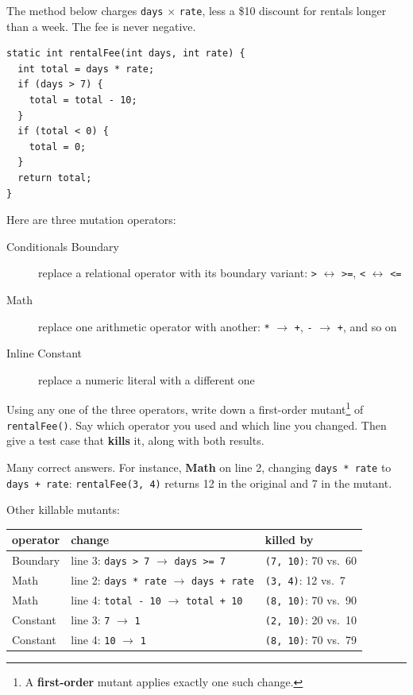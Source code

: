 \documentclass[addpoints]{exam}
\begin{document}
\begin{questions}

\question The method below charges \texttt{days} $\times$
  \texttt{rate}, less a \$10 discount for rentals longer than a week.
  The fee is never negative.

\begin{verbatim}
static int rentalFee(int days, int rate) {
  int total = days * rate;
  if (days > 7) {
    total = total - 10;
  }
  if (total < 0) {
    total = 0;
  }
  return total;
}
\end{verbatim}

  Here are three mutation operators:

  \begin{description}
  \item[Conditionals Boundary] replace a relational operator with its
    boundary variant: \texttt{>} $\leftrightarrow$ \texttt{>=},
    \texttt{<} $\leftrightarrow$ \texttt{<=}
  \item[Math] replace one arithmetic operator with another:
    \texttt{*} $\rightarrow$ \texttt{+}, \texttt{-} $\rightarrow$
    \texttt{+}, and so on
  \item[Inline Constant] replace a numeric literal with a different one
  \end{description}

  Using any one of the three operators, write down a first-order
    mutant\footnote{ A \textbf{first-order} mutant applies exactly one
      such change.} of \texttt{rentalFee()}. Say which
    operator you used and which line you changed. Then give a test
    case that \textbf{kills} it, along with both results.
    \begin{solution} %
      Many correct answers. For instance, \textbf{Math} on line 2,
      changing \texttt{days * rate} to
      \texttt{days + rate}:
      \texttt{rentalFee(3, 4)} returns 12 in the original and
      7 in the mutant.

      Other killable mutants:

      \begin{tabular}{lll}
        \textbf{operator} & \textbf{change} & \textbf{killed by} \\
        \hline
        Boundary & line 3: \texttt{days > 7} $\to$ \texttt{days >= 7}
          & \texttt{(7, 10)}: 70 vs.\ 60 \\
        Math & line 2: \texttt{days * rate} $\to$ \texttt{days + rate}
          & \texttt{(3, 4)}: 12 vs.\ 7 \\
        Math & line 4: \texttt{total - 10} $\to$ \texttt{total + 10}
          & \texttt{(8, 10)}: 70 vs.\ 90 \\
        Constant & line 3: \texttt{7} $\to$ \texttt{1}
          & \texttt{(2, 10)}: 20 vs.\ 10 \\
        Constant & line 4: \texttt{10} $\to$ \texttt{1}
          & \texttt{(8, 10)}: 70 vs.\ 79 \\
      \end{tabular}
    \end{solution}


\end{questions}
\end{document}
